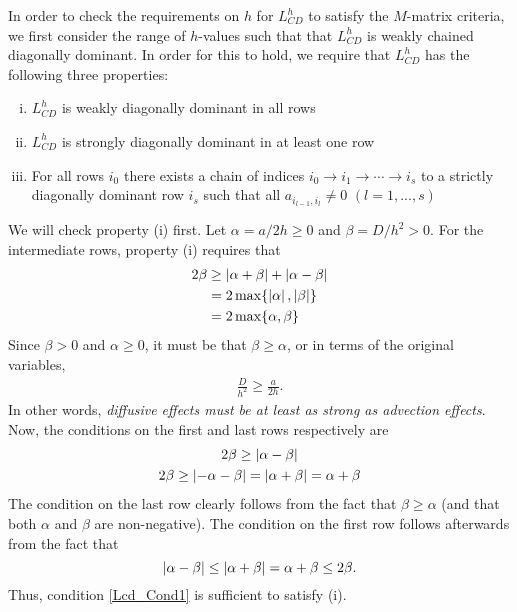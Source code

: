 \begin{problem}{1}
\begin{solution}
\pagebreak

In order to check the requirements on $h$ for $L^h_{CD}$ to satisfy
the $M$-matrix criteria, we first consider the range of $h$-values such
that that $L^h_{CD}$ is weakly chained diagonally dominant.
In order for this to hold, we 
require that $L^h_{CD}$ has the following three properties:
\begin{enumerate}[(i)]
    \item $L^h_{CD}$ is weakly diagonally dominant in all rows
    \item $L^h_{CD}$ is strongly diagonally dominant in at least one row
    \item For all rows $i_0$ there exists a chain of indices $i_0
    \rightarrow i_1 \rightarrow \cdots \rightarrow i_s$ to a strictly
    diagonally dominant row $i_s$ such that all $a_{i_{l-1},i_l} \neq 0$
    $(l = 1, ..., s)$
\end{enumerate}

We will check property (i) first. Let $\alpha = a/2h \geq 0$ and 
$\beta = D/h^2 > 0$. For the intermediate rows, property (i) requires that
\begin{align}\label{Lcd_MidRows}
    2 \beta &\geq \left| \alpha + \beta \right| + \left| \alpha - \beta \right| \\
            &= 2\max\{\left| \alpha \right|,\left| \beta \right|\} \nonumber \\
            &= 2\max\{\alpha,\beta\} \nonumber
\end{align}
Since $\beta > 0$ and $\alpha \geq 0$, it must be that 
$\beta \geq \alpha$, or in terms of the original variables,
\begin{align}\label{Lcd_Cond1}
    \frac{D}{h^2} \geq \frac{a}{2h}.
\end{align}
In other words, \textit{diffusive effects must be at least as
strong as advection effects}.
Now, the conditions on the first and last rows respectively are
\begin{gather}
    2\beta \geq \left| \alpha - \beta \right|\label{Lcd_FirstRow} \\
    2\beta \geq \left| -\alpha - \beta \right| = \left| \alpha + \beta \right| = \alpha + \beta\label{Lcd_LastRow}
\end{gather}
The condition on the last row clearly follows from the fact that
$\beta \geq \alpha $ (and that both $\alpha$ and $\beta$ are 
non-negative). The condition on the first row follows afterwards
from the fact that
$$\left| \alpha - \beta \right| \leq \left| \alpha + \beta \right|
= \alpha + \beta \leq 2\beta.$$
Thus, condition \ref{Lcd_Cond1} is sufficient to satisfy (i).


\end{solution}
\end{problem}
